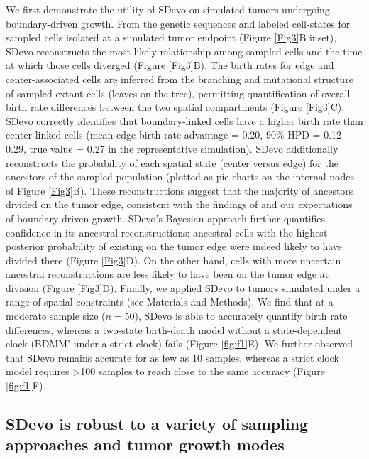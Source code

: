 \documentclass[12pt]{elife_based}
\begin{document}
We first demonstrate the utility of SDevo on simulated tumors undergoing boundary-driven growth. From the genetic sequences and labeled cell-states for sampled cells isolated at a simulated tumor endpoint (Figure \ref{Fig3}B inset), SDevo reconstructs the most likely relationship among sampled cells and the time at which those cells diverged (Figure \ref{Fig3}B). The birth rates for edge and center-associated cells are inferred from the branching and mutational structure of sampled extant cells (leaves on the tree), permitting quantification of overall birth rate differences between the two spatial compartments (Figure \ref{Fig3}C). SDevo correctly identifies that boundary-linked cells have a higher birth rate than center-linked cells (mean edge birth rate advantage = 0.20, 90\% HPD = 0.12 - 0.29, true value = 0.27 in the representative simulation). SDevo additionally reconstructs the probability of each spatial state (center versus edge) for the ancestors of the sampled population (plotted as pie charts on the internal nodes of Figure \ref{Fig3}B). These reconstructions suggest that the majority of ancestors divided on the tumor edge, consistent with the findings of \cite{Heide2021.07.14.451265} and our expectations of boundary-driven growth. SDevo's Bayesian approach further quantifies confidence in its ancestral reconstructions: ancestral cells with the highest posterior probability of existing on the tumor edge were indeed likely to have divided there (Figure \ref{Fig3}D). On the other hand, cells with more uncertain ancestral reconstructions are less likely to have been on the tumor edge at division (Figure \ref{Fig3}D). Finally, we applied SDevo to tumors simulated under a range of spatial constraints (see Materials and Methods). We find that at a moderate sample size ($n=50$), SDevo is able to accurately quantify birth rate differences, whereas a two-state birth-death model without a state-dependent clock (BDMM' under a strict clock) fails (Figure \ref{fig:f1}E). We further observed that SDevo remains accurate for as few as 10 samples, whereas a strict clock model requires >100 samples to reach close to the same accuracy (Figure \ref{fig:f1}F).


 \subsection*{SDevo is robust to a variety of sampling approaches and tumor growth modes}
\end{document}
